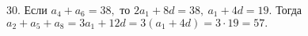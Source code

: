 30. Если $a_4+a_6=38,$ то $2a_1+8d=38,\ a_1+4d=19.$ Тогда $a_2+a_5+a_{8}=3a_1+12d=3(a_1+4d)=3\cdot19=57.$\\
